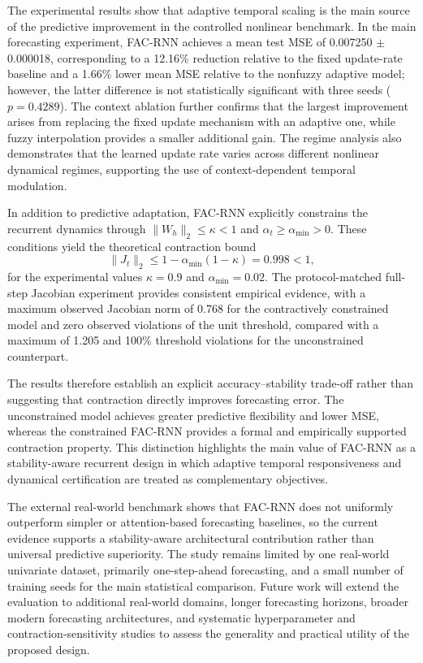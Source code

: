 \documentclass[journal]{IEEEtran}
\begin{document}
	The experimental results show that adaptive temporal scaling is the main source of the predictive improvement in the controlled nonlinear benchmark. In the main forecasting experiment, FAC-RNN achieves a mean test MSE of 0.007250 $\pm$ 0.000018, corresponding to a 12.16\% reduction relative to the fixed update-rate baseline and a 1.66\% lower mean MSE relative to the nonfuzzy adaptive model; however, the latter difference is not statistically significant with three seeds ($p=0.4289$). The context ablation further confirms that the largest improvement arises from replacing the fixed update mechanism with an adaptive one, while fuzzy interpolation provides a smaller additional gain. The regime analysis also demonstrates that the learned update rate varies across different nonlinear dynamical regimes, supporting the use of context-dependent temporal modulation.
	
	In addition to predictive adaptation, FAC-RNN explicitly constrains the recurrent dynamics through $\lVert W_h\rVert_2\leq\kappa<1$ and $\alpha_t\geq\alpha_{\min}>0$. These conditions yield the theoretical contraction bound
	\begin{equation}
		\lVert J_t\rVert_2
		\leq
		1-\alpha_{\min}(1-\kappa)
		=
		0.998
		<1,
	\end{equation}
	for the experimental values $\kappa=0.9$ and $\alpha_{\min}=0.02$. The protocol-matched full-step Jacobian experiment provides consistent empirical evidence, with a maximum observed Jacobian norm of 0.768 for the contractively constrained model and zero observed violations of the unit threshold, compared with a maximum of 1.205 and 100\% threshold violations for the unconstrained counterpart.
	
	The results therefore establish an explicit accuracy--stability trade-off rather than suggesting that contraction directly improves forecasting error. The unconstrained model achieves greater predictive flexibility and lower MSE, whereas the constrained FAC-RNN provides a formal and empirically supported contraction property. This distinction highlights the main value of FAC-RNN as a stability-aware recurrent design in which adaptive temporal responsiveness and dynamical certification are treated as complementary objectives.
	
	The external real-world benchmark shows that FAC-RNN does not uniformly outperform simpler or attention-based forecasting baselines, so the current evidence supports a stability-aware architectural contribution rather than universal predictive superiority. The study remains limited by one real-world univariate dataset, primarily one-step-ahead forecasting, and a small number of training seeds for the main statistical comparison. Future work will extend the evaluation to additional real-world domains, longer forecasting horizons, broader modern forecasting architectures, and systematic hyperparameter and contraction-sensitivity studies to assess the generality and practical utility of the proposed design.
	
	



	
\end{document}
